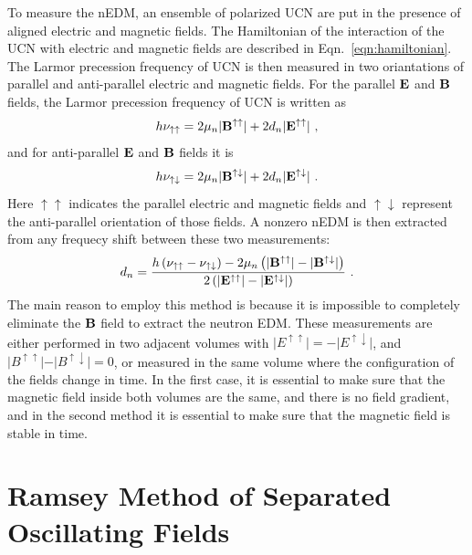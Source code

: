 To measure the nEDM, an ensemble of polarized UCN are put in the
presence of aligned electric and magnetic fields. The Hamiltonian of
the interaction of the UCN with electric and magnetic fields are
described in Eqn.~\ref{eqn:hamiltonian}. The Larmor precession
frequency of UCN is then measured in two oriantations of parallel and
anti-parallel electric and magnetic fields. For the parallel $\bf{E}$
and $\bf{B}$ fields, the Larmor precession frequency of UCN is written
as
\begin{equation}
\label{eqn:parallelEandB}
  h \nu_{\uparrow \uparrow} = 2 \mu_n \vert {\bf{B^{\uparrow \uparrow}}} \vert+ 2 d_n\vert \bf{ E^{\uparrow \uparrow}} \vert~,
\end{equation}
and for anti-parallel  $\bf{E}$ and $\bf{B}$ fields it is
\begin{equation}
\label{eqn:antiparallelEandB}
  h \nu_{\uparrow \downarrow} = 2 \mu_n \vert {\bf{B^{\uparrow \downarrow}}} \vert+ 2 d_n\vert \bf{ E^{\uparrow \downarrow}} \vert~.
\end{equation}
Here $\uparrow \uparrow$ indicates the parallel electric and magnetic
fields and $\uparrow \downarrow$ represent the anti-parallel
orientation of those fields.  A nonzero nEDM is then extracted from
any frequecy shift between these two measurements:
\begin{equation}
  \label{eqn:dn}
  d_n = \frac{h \left( \nu_{\uparrow \uparrow} - \nu_{\uparrow \downarrow} \right) - 2 \mu_n \left( \vert {\bf{B^{\uparrow \uparrow}}} \vert -\vert {\bf{B^{\uparrow \downarrow}}} \vert \right)}{2 \left(\vert \bf{ E^{\uparrow \uparrow}} \vert - \vert \bf{ E^{\uparrow \downarrow}} \vert \right)}~.
\end{equation}
The main reason to employ this method is because it is impossible to
completely eliminate the $\bf{B}$ field to extract the neutron
EDM. These measurements are either performed in two adjacent volumes
with
$\vert E^{\uparrow \uparrow} \vert = - \vert E^{\uparrow \downarrow}
\vert$, and
$\vert B^{\uparrow \uparrow}\vert - \vert B^{\uparrow \downarrow} \vert= 0
$, or measured in the same volume where the configuration of the fields
change in time. In the first case, it is essential to make sure that
the magnetic field inside both volumes are the same, and there is no
field gradient, and in the second method it is essential to make sure
that the magnetic field is stable in time.

\section{Ramsey Method of Separated Oscillating
  Fields\label{sec:Ramsey}}

